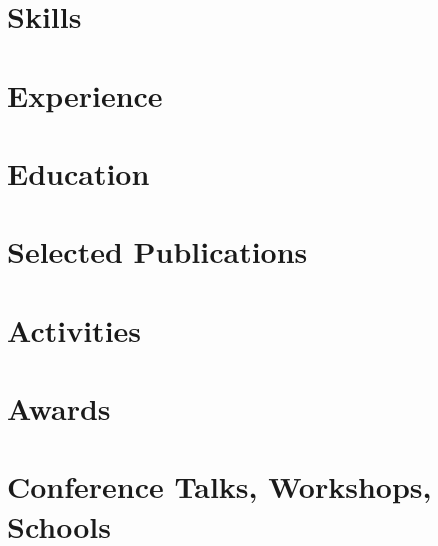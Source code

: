 \documentclass[letter,10pt]{article}
\begin{document}


\section{Skills}


\section{Experience}


\newpage

\section{Education}



\section{Selected Publications}


\section{Activities}


\section{Awards}


\section{Conference Talks, Workshops, Schools}

\end{document}
